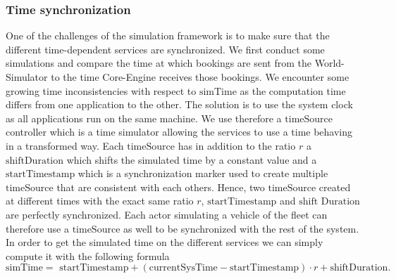 \documentclass[12pt,a4paper]{article}
\begin{document}
\subsubsection{Time synchronization}
One of the challenges of the simulation framework is to make sure that the different time-dependent services are synchronized. We first conduct some simulations and compare the time at which bookings are sent from the World-Simulator to the time Core-Engine receives those bookings. We encounter some growing time inconsistencies with respect to $\text{simTime}$ as the computation time differs from one application to the other. The solution is to use the system clock as all applications run on the same machine. We use therefore a $\text{timeSource}$ controller which is a time simulator allowing the services to use a time behaving in a transformed way. Each $\text{timeSource}$ has in addition to the ratio $r$ a $\text{shiftDuration}$ which shifts the simulated time by a constant value and a $\text{startTimestamp}$ which is a synchronization marker used to create multiple $\text{timeSource}$ that are consistent with each others. Hence, two $\text{timeSource}$ created at different times with the exact same ratio $r$, $\text{startTimestamp}$ and $\text{shift Duration}$ are perfectly synchronized. Each actor simulating a vehicle of the fleet can therefore use a $\text{timeSource}$ as well to be synchronized with the rest of the system. In order to get the simulated time on the different services we can simply compute it with the following formula
$$\text{simTime} =\text{ startTimestamp} + (\text{currentSysTime} - \text{startTimestamp}) \cdot r + \text{shiftDuration}.$$
\end{document}
